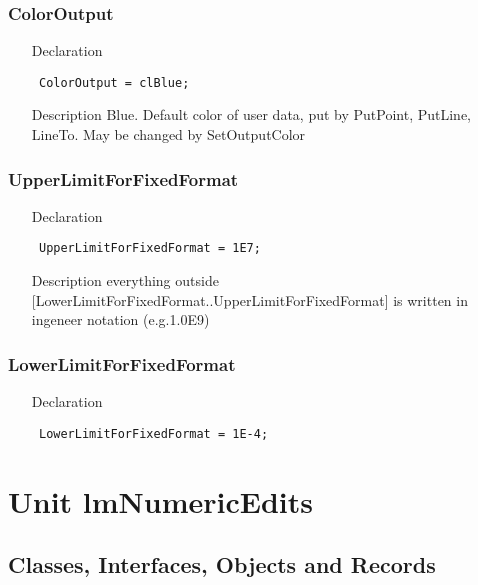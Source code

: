 \documentclass[12pt,a4paper,oneside]{report}
\newcommand{\declarationitem}[1]{{\addfontfeatures{FakeSlant} #1}}
\newcommand{\descriptiontitle}[1]{{\addfontfeatures{FakeSlant}#1}}
\newcommand{\code}[1]{\texttt{#1}}
\begin{document}
\subsection*{ColorOutput}
\label{lmcoordsys-ColorOutput}
\begin{itemize}\item[\declarationitem{Declaration}\hfill]
\begin{flushleft}
\code{
ColorOutput    =  clBlue;}
\end{flushleft}
\item[\descriptiontitle{Description}]
Blue. Default color of user data, put by PutPoint, PutLine, LineTo. May be changed by SetOutputColor
\end{itemize}
\subsection*{UpperLimitForFixedFormat}
\label{lmcoordsys-UpperLimitForFixedFormat}
\begin{itemize}\item[\declarationitem{Declaration}\hfill]
\begin{flushleft}
\code{
UpperLimitForFixedFormat = 1E7;}
\end{flushleft}
\item[\descriptiontitle{Description}]
everything outside [LowerLimitForFixedFormat..UpperLimitForFixedFormat] is written in ingeneer notation (e.g.1.0E9)
\end{itemize}
\subsection*{LowerLimitForFixedFormat}
\label{lmcoordsys-LowerLimitForFixedFormat}
\begin{itemize}\item[\declarationitem{Declaration}\hfill]
\begin{flushleft}
\code{
LowerLimitForFixedFormat = 1E-4;}
\end{flushleft}
\end{itemize}

\chapter{Unit lmNumericEdits}
\label{lmnumericedits}
\section{Classes, Interfaces, Objects and Records}
\end{document}
